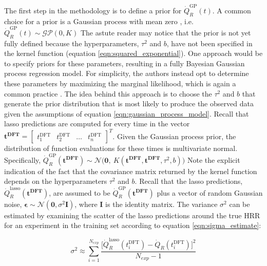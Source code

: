 \documentclass{article}
\begin{document}
The first step in the methodology is to define a prior for $\dot{Q}_{R}^{\text{GP}}(t)$. A common choice for a prior is a Gaussian process with mean zero \cite{rasmussen2003gaussian}, i.e. $\dot{Q}_{R}^{\text{GP}}(t) \sim \mathcal{GP}(0, K)$ The astute reader may notice that the prior is not yet fully defined because the hyperparameters, $\tau^2$ and $b$, have not been specified in the kernel function (equation \ref{eqn:squared_exponential}). One approach would be to specify priors for these parameters, resulting in a fully Bayesian Gaussian process regression model. For simplicity, the authors instead opt to determine these parameters by maximizing the marginal likelihood, which is again a common practice \cite{rasmussen2003gaussian}. The idea behind this approach is to choose the $\tau^2$ and $b$ that generate the prior distribution that is most likely to produce the observed data given the assumptions of equation \ref{eqn:gaussian_process_model}. Recall that lasso predictions are computed for every time in the vector $\boldsymbol{t^{\text{DFT}}} = \begin{bmatrix}  t^{\text{DFT}}_1 & t^{\text{DFT}}_2 & \ldots & t^{\text{DFT}}_n \end{bmatrix}^T$. Given the Gaussian process prior, the distribution of function evaluations for these times is multivariate normal. Specifically,  $\dot{Q}_{R}^{\text{GP}}(\boldsymbol{t^{\text{DFT}}}) \sim \mathcal{N}\Big(\boldsymbol{0}, \  K( \boldsymbol{t^{\text{DFT}}}, \boldsymbol{t^{\text{DFT}}}, \tau^2, b) \Big)$ Note the explicit indication of the fact that the covariance matrix returned by the kernel function depends on the hyperparameters $\tau^2$ and $b$. Recall that the lasso predictions, $\dot{Q}_{R}^{\text{lasso}}(\boldsymbol{t^{\text{DFT}}})$,  are assumed to be $\dot{Q}_{R}^{\text{GP}}(\boldsymbol{t^{\text{DFT}}})$ plus a vector of random Gaussian noise, $\boldsymbol{\epsilon} \sim \mathcal{N}(\boldsymbol{0}, \sigma^2\boldsymbol{I})$, where $\boldsymbol{I}$ is the identity matrix. The variance $\sigma^2$ can be estimated by examining the scatter of the lasso predictions around the true HRR for an experiment in the training set according to equation \ref{eqn:sigma_estimate}: 

 \begin{equation}
  \label{eqn:sigma_estimate}
    \sigma^2 \approx \sum_{i=1}^{N_{exp}}\frac{\Big[\dot{Q}_{R}^{\text{lasso}}(t^{\text{DFT}}_i) - \dot{Q}_{R}(t_i^{\text{DFT}})\Big]^2}{N_{exp}-1} 
\end{equation}
\end{document}
